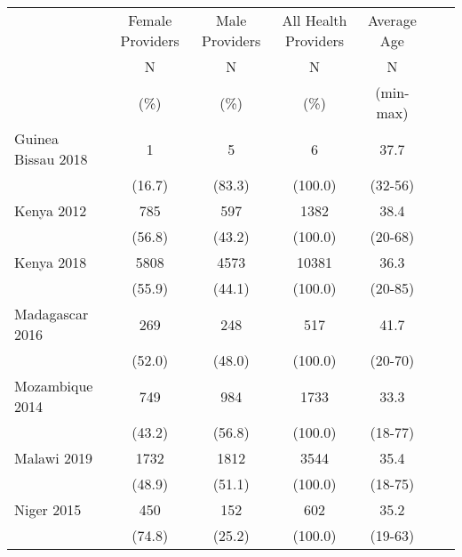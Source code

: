 \def\sym#1{\ifmmode^{#1}\else\(^{#1}\)\fi}
\begin{tabular}{l*{6}{c}}
\hline\hline
         &\multicolumn{1}{c}{Female Providers}&\multicolumn{1}{c}{Male Providers}&\multicolumn{1}{c}{All Health Providers}&\multicolumn{1}{c}{Average Age}&\\
               &       N&                     N&       N&                                       N\\
               &     (\%)&                 (\%)&    (\%)&                                     (min-max)\\
\hline
Guinea Bissau 2018&            {1}&                {5}&           {6}&              {37.7}\\
&                                              {(16.7)}&      {(83.3)}&             {(100.0)}&            {(32-56)}\\
Kenya 2012&                            {785}&                {597}&           {1382}&              {38.4}\\
&                                              {(56.8)}&      {(43.2)}&             {(100.0)}&            {(20-68)}\\
Kenya 2018&                    {5808}&                {4573}&           {10381}&              {36.3}\\
&                                              {(55.9)}&      {(44.1)}&             {(100.0)}&            {(20-85)}\\
Madagascar 2016&               {269}&                {248}&           {517}&              {41.7}\\
&                                              {(52.0)}&      {(48.0)}&             {(100.0)}&            {(20-70)}\\
Mozambique 2014&               {749}&                {984}&           {1733}&              {33.3}\\
&                                              {(43.2)}&      {(56.8)}&             {(100.0)}&            {(18-77)}\\
Malawi 2019&                   {1732}&                {1812}&           {3544}&              {35.4}\\
&                                              {(48.9)}&      {(51.1)}&             {(100.0)}&            {(18-75)}\\
Niger 2015&                    {450}&                {152}&           {602}&              {35.2}\\
&                                              {(74.8)}&      {(25.2)}&             {(100.0)}&            {(19-63)}\\

\end{tabular}
